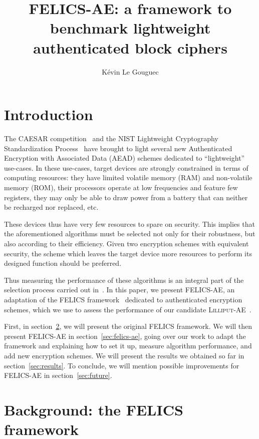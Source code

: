 \documentclass{article}
\title{
  FELICS-AE: a framework to benchmark lightweight authenticated block ciphers
}
\author[*]{Kévin Le Gouguec}
\affil[*]{
  Airbus CyberSecurity -
  ZA Clef Saint-Pierre,
  1 Bd Jean Moulin,
  CS 40001,
  MetaPole,
  78996 ÉLANCOURT Cedex -
  France -
  \href{mailto:kevin.legouguec@airbus.com}{kevin.legouguec@airbus.com}
}
\begin{document}
\maketitle

\section{Introduction}
\label{sec:intro}

The CAESAR competition~\cite{CAESAR:submissions} and the NIST
Lightweight Cryptography Standardization Process~\cite{NIST:LWC} have
brought to light several new Authenticated Encryption with Associated
Data (AEAD) schemes dedicated to ``lightweight'' use-cases.  In these
use-cases, target devices are strongly constrained in terms of
computing resources: they have limited volatile memory (RAM) and
non-volatile memory (ROM), their processors operate at low frequencies
and feature few registers, they may only be able to draw power from a
battery that can neither be recharged nor replaced, etc.

These devices thus have very few resources to spare on security.  This
implies that the aforementioned algorithms must be selected not only
for their robustness, but also according to their efficiency.  Given
two encryption schemes with equivalent security, the scheme which
leaves the target device more resources to perform its designed
function should be preferred.

Thus measuring the performance of these algorithms is an integral part
of the selection process carried out in~\cite{NIST:LWC}.  In this
paper, we present FELICS-AE, an adaptation of the FELICS
framework~\cite{FELICS:paper} dedicated to authenticated encryption
schemes, which we use to assess the performance of our candidate
\textsc{Lilliput-AE}~\cite{NIST:Lilliput-AE}.

First, in section~\ref{sec:felics}, we will present the original
FELICS framework.  We will then present FELICS-AE in
section~\ref{sec:felics-ae}, going over our work to adapt the
framework and explaining how to set it up, measure algorithm
performance, and add new encryption schemes.  We will present the
results we obtained so far in section~\ref{sec:results}.  To conclude,
we will mention possible improvements for FELICS-AE in
section~\ref{sec:future}.

\section{Background: the FELICS framework}
\label{sec:felics}
\end{document}
